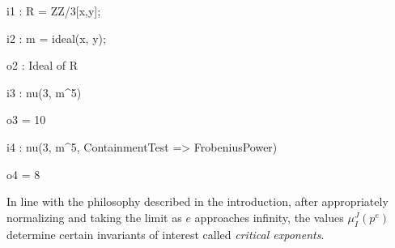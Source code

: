 \documentclass{amsart}
\begin{document}
{\small
{}
\begin{MyVerbatim}

i1 : R = ZZ/3[x,y];

i2 : m = ideal(x, y);

o2 : Ideal of R

i3 : nu(3, m^5)

o3 = 10

i4 : nu(3, m^5, ContainmentTest => FrobeniusPower)

o4 = 8
\end{MyVerbatim}
}

\medspace
\noindent In line with the philosophy described in the introduction, after appropriately normalizing and taking the limit as $e$ approaches infinity, the values $\mu_I^J(p^e)$ determine certain invariants of interest called \emph{critical exponents}.






\end{document}
